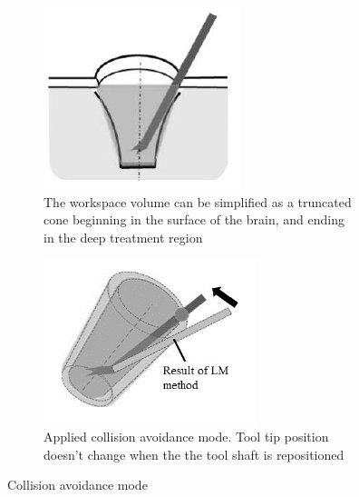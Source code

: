 \begin{figure}[H]
    \centering
    \begin{subfigure}[b]{0.3\textwidth}
        \includegraphics[width=\textwidth]{Figures/workspace_model.png}
        \caption{The workspace volume can be simplified as a truncated cone
beginning in the surface of the brain, and ending in the deep treatment region}
        \label{fig:workspace_model}
    \end{subfigure}
    \qquad \qquad
    \begin{subfigure}[b]{0.3\textwidth}
        \includegraphics[width=\textwidth]{Figures/collision_avoidance.png}
        \caption{Applied collision avoidance mode. Tool tip position doesn't change when the the tool shaft is repositioned}
        \label{fig:reposition}
    \end{subfigure}
    \caption{Collision avoidance mode \cite{collisionAvoidanceNeuro}}
    \label{fig:collisionavoidancemaode}
\end{figure}
 
